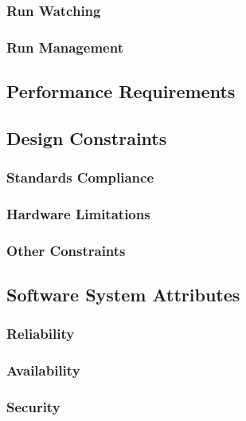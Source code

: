 \documentclass[a4paper]{article}
\begin{document}
        \subsubsection{Run Watching}
        
        \subsubsection{Run Management}
        
    \subsection{Performance Requirements}
    
    \subsection{Design Constraints}
    
        \subsubsection{Standards Compliance}
        
        \subsubsection{Hardware Limitations}
        
        \subsubsection{Other Constraints}
    
    \subsection{Software System Attributes}
        
        \subsubsection{Reliability}
        
        \subsubsection{Availability}
        
        \subsubsection{Security}
        
\end{document}
